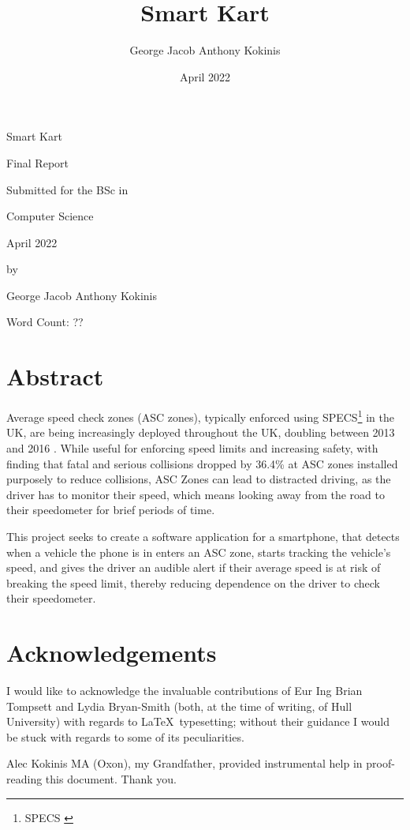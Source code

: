 \documentclass[11pt, a4paper, notitlepage]{report}
\title{Smart Kart}
\date{April 2022}
\author{George Jacob Anthony Kokinis}
\begin{document}
\begin{center}
	{\Huge Smart Kart}
	
	\bigskip
	{\Large Final Report}
	
	\bigskip
	Submitted for the BSc in
	
	\bigskip
	{\LARGE Computer Science}
	
	\bigskip
	April 2022
	
	\bigskip
	by 
	
	\bigskip
	{\LARGE George Jacob Anthony Kokinis}
    
    \bigskip
    Word Count: ?? %
\end{center}
\newpage
\section{Abstract}
Average speed check zones (ASC zones), typically enforced using SPECS\footnote{SPECS \citep{specsjenop}} in the UK, are being increasingly deployed throughout the UK, doubling between 2013 and 2016 \citep{BBCSpeedCameraDoubled}. While useful for enforcing speed limits and increasing safety, with \citet{owenAllsop} finding that fatal and serious collisions dropped by 36.4\% at ASC zones installed purposely to reduce collisions, ASC Zones can lead to distracted driving, as the driver has to monitor their speed, which means looking away from the road to their speedometer for brief periods of time.

This project seeks to create a software application for a smartphone, that detects when a vehicle the phone is in enters an ASC zone, starts tracking the vehicle's speed, and gives the driver an audible alert if their average speed is at risk of breaking the speed limit, thereby reducing dependence on the driver to check their speedometer.

\section{Acknowledgements}
I would like to acknowledge the invaluable contributions of Eur Ing Brian Tompsett and Lydia Bryan-Smith (both, at the time of writing, of Hull University) with regards to \LaTeX\ typesetting; without their guidance I would be stuck with regards to some of its peculiarities.

Alec Kokinis MA (Oxon), my Grandfather, provided instrumental help in proof-reading this document. Thank you.
\end{document}
